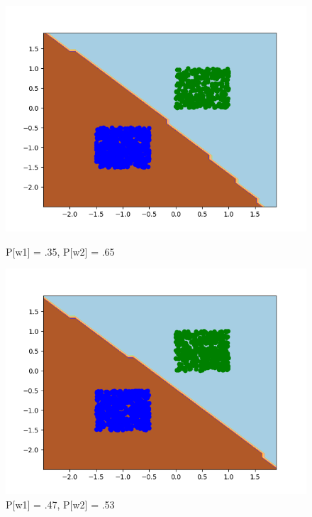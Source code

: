 \documentclass{article}
\begin{document}
\begin{figure}[!htb]
	\begin{minipage}{0.24\textwidth}
		\centering
		\includegraphics[width=1\linewidth]{../changingpriors/this9.png}
		\caption{P[w1] = .35, P[w2] = .65}
	\end{minipage}
	\begin{minipage}{0.24\textwidth}
		\centering
		\includegraphics[width=1\linewidth]{../changingpriors/this13.png}
		\caption{P[w1] = .47, P[w2] = .53}
	\end{minipage}
	\begin{minipage}{0.24\textwidth}
		\centering

\end{minipage}
\end{figure}
\end{document}
